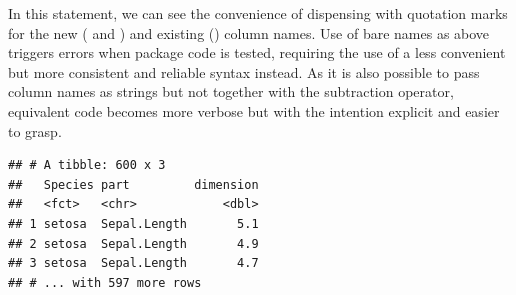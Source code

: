 \documentclass[krantz2]{krantz}\usepackage{knitr}
\begin{document}
In this statement, we can see the convenience of dispensing with quotation marks for the new ( and ) and existing () column names. Use of bare names as above triggers errors when package code is tested, requiring the use of a less convenient but more consistent and reliable syntax instead. As it is also possible to pass column names as strings but not together with the subtraction operator, equivalent code becomes more verbose but with the intention explicit and easier to grasp.

\begin{knitrout}\footnotesize
{}\color{fgcolor}\begin{kframe}
\begin{alltt}
 \hlkwb{<-}   \hlstd{=} \hlstd{,}  \hlstd{=} \hlstd{,} \hlstd{(} \hlstd{))}
\end{alltt}
\begin{verbatim}
## # A tibble: 600 x 3
##   Species part         dimension
##   <fct>   <chr>            <dbl>
## 1 setosa  Sepal.Length       5.1
## 2 setosa  Sepal.Length       4.9
## 3 setosa  Sepal.Length       4.7
## # ... with 597 more rows
\end{verbatim}
\end{kframe}
\end{knitrout}
\end{document}
